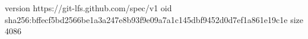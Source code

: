 version https://git-lfs.github.com/spec/v1
oid sha256:bffecf5bd2566be1a3a247e8b93f9e09a7a1c145dbf9452d0d7ef1a861e19c1e
size 4086
